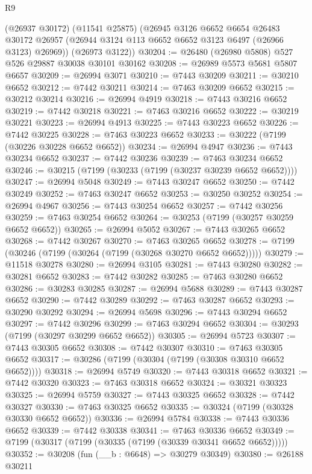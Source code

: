 \begin{lexlean}{R9}
\begin{coremodule}
      (@26937 @30172)
      (@11541 @25875)
      (@26945
        @3126
        @6652
        @6654
        @26483
        @30172
        @26957
        (@26944 @3124 @113 @6652 @6652 @3123 @6497 (@26966 @3123) @26969))
      (@26973 @3122))
@30204 := @26480 (@26980 @5808) @527 @526 @29887 @30038 @30101 @30162
@30208 := @26989 @5573 @5681 @5807 @6657
@30209 := @26994 @3071
@30210 := @7443 @30209
@30211 := @30210 @6652
@30212 := @7442 @30211
@30214 := @7463 @30209 @6652
@30215 := @30212 @30214
@30216 := @26994 @4919
@30218 := @7443 @30216 @6652
@30219 := @7442 @30218
@30221 := @7463 @30216 @6652
@30222 := @30219 @30221
@30223 := @26994 @4913
@30225 := @7443 @30223 @6652
@30226 := @7442 @30225
@30228 := @7463 @30223 @6652
@30233 := @30222 (@7199 (@30226 @30228 @6652 @6652))
@30234 := @26994 @4947
@30236 := @7443 @30234 @6652
@30237 := @7442 @30236
@30239 := @7463 @30234 @6652
@30246 := @30215 (@7199 (@30233 (@7199 (@30237 @30239 @6652 @6652))))
@30247 := @26994 @5048
@30249 := @7443 @30247 @6652
@30250 := @7442 @30249
@30252 := @7463 @30247 @6652
@30253 := @30250 @30252
@30254 := @26994 @4967
@30256 := @7443 @30254 @6652
@30257 := @7442 @30256
@30259 := @7463 @30254 @6652
@30264 := @30253 (@7199 (@30257 @30259 @6652 @6652))
@30265 := @26994 @5052
@30267 := @7443 @30265 @6652
@30268 := @7442 @30267
@30270 := @7463 @30265 @6652
@30278 := @7199 (@30246 (@7199 (@30264 (@7199 (@30268 @30270 @6652 @6652)))))
@30279 := @11518 @30278
@30280 := @26994 @3105
@30281 := @7443 @30280
@30282 := @30281 @6652
@30283 := @7442 @30282
@30285 := @7463 @30280 @6652
@30286 := @30283 @30285
@30287 := @26994 @5688
@30289 := @7443 @30287 @6652
@30290 := @7442 @30289
@30292 := @7463 @30287 @6652
@30293 := @30290 @30292
@30294 := @26994 @5698
@30296 := @7443 @30294 @6652
@30297 := @7442 @30296
@30299 := @7463 @30294 @6652
@30304 := @30293 (@7199 (@30297 @30299 @6652 @6652))
@30305 := @26994 @5723
@30307 := @7443 @30305 @6652
@30308 := @7442 @30307
@30310 := @7463 @30305 @6652
@30317 := @30286 (@7199 (@30304 (@7199 (@30308 @30310 @6652 @6652))))
@30318 := @26994 @5749
@30320 := @7443 @30318 @6652
@30321 := @7442 @30320
@30323 := @7463 @30318 @6652
@30324 := @30321 @30323
@30325 := @26994 @5759
@30327 := @7443 @30325 @6652
@30328 := @7442 @30327
@30330 := @7463 @30325 @6652
@30335 := @30324 (@7199 (@30328 @30330 @6652 @6652))
@30336 := @26994 @5784
@30338 := @7443 @30336 @6652
@30339 := @7442 @30338
@30341 := @7463 @30336 @6652
@30349 := @7199 (@30317 (@7199 (@30335 (@7199 (@30339 @30341 @6652 @6652)))))
@30352 := @30208 (fun (__b : @6648) => @30279 @30349)
@30380 := @26188
    @30211

\end{coremodule}
\end{lexlean}
